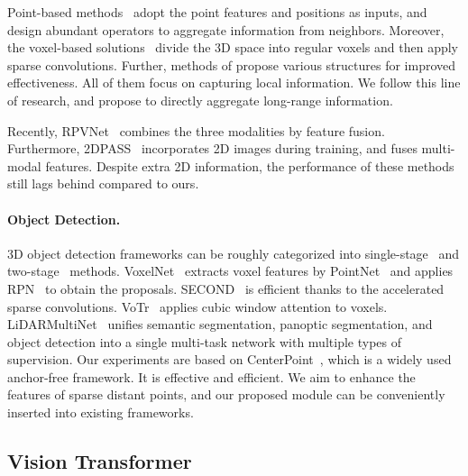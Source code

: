 \documentclass[10pt,twocolumn,letterpaper]{article}
\begin{document}
Point-based methods~\cite{qi2017pointnet, qi2017pointnet++, thomas2019kpconv, yan2020pointasnl, hu2020randla, tatarchenko2018tangent, lai2022stratified} adopt the point features and positions as inputs, and design abundant operators to aggregate information from neighbors. Moreover, the voxel-based solutions~\cite{3DSemanticSegmentationWithSubmanifoldSparseConvNet, SubmanifoldSparseConvNet, choy20194d} divide the 3D space into regular voxels and then apply sparse convolutions. Further, methods of \cite{yan2021sparse,tang2020searching,zhu2021cylindrical,cheng20212,liu2022less,jiang2021guided,cohen2018spherical} propose various structures for improved effectiveness. All of them focus on capturing local information. We follow this line of research, and propose to directly aggregate long-range information.

Recently, RPVNet~\cite{xu2021rpvnet} combines the three modalities by feature fusion. Furthermore, 2DPASS~\cite{yan20222dpass} incorporates 2D images during training, and \cite{Robert_2022_CVPR} fuses multi-modal features. Despite extra 2D information, the performance of these methods still lags behind compared to ours.

\paragraph{Object Detection.} 
3D object detection frameworks can be roughly categorized into single-stage~\cite{3dssd, sessd, sassd, cia-ssd, spatial-pruned-conv, chen2023voxenext} and two-stage~\cite{point-rcnn, voxel-rcnn, pvrcnn, pyramid-rcnn} methods. VoxelNet~\cite{voxelnet} extracts voxel features by PointNet~\cite{qi2017pointnet} and applies RPN~\cite{fasterrcnn} to obtain the proposals. SECOND~\cite{second} is efficient thanks to the accelerated sparse convolutions. VoTr~\cite{mao2021voxel} applies cubic window attention to voxels. LiDARMultiNet~\cite{ye2022lidarmultinet} unifies semantic segmentation, panoptic segmentation, and object detection into a single multi-task network with multiple types of supervision.  Our experiments are based on CenterPoint~\cite{yin2021center}, which is a widely used anchor-free framework. It is effective and efficient. We aim to enhance the features of sparse distant points, and our proposed module can be conveniently inserted into existing frameworks. 



\subsection{Vision Transformer}
\end{document}
